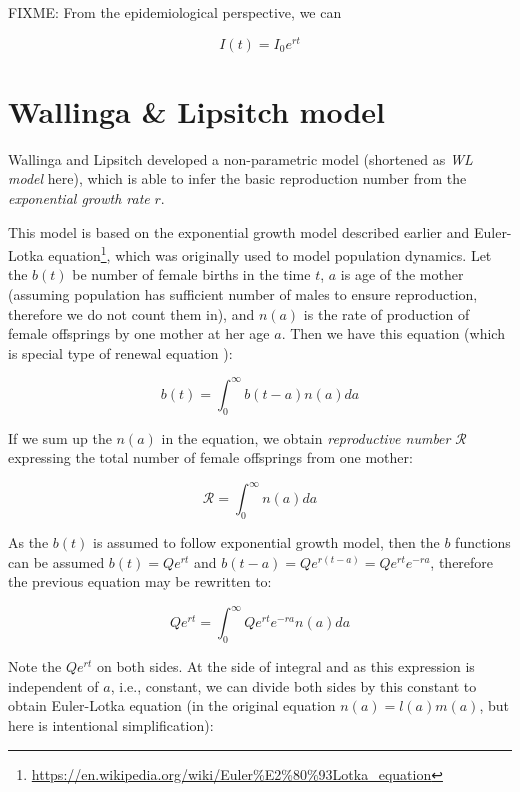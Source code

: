 \documentclass[
  digital, %
  oneside, %
  lof,     %
  lot,     %
]{fithesis4}
\begin{document}
FIXME: From the epidemiological perspective, we can 

\begin{equation}
  I(t) = I_0 e^{rt}
\end{equation}

\section{Wallinga \& Lipsitch model}

Wallinga and Lipsitch \cite{wallinga2007} developed a non-parametric
model (shortened as \textit{WL model} here), which is able to infer
the basic reproduction number from the \textit{exponential growth rate} $r$.

This model is based on the exponential growth model described earlier and
Euler-Lotka equation\footnote{\url{https://en.wikipedia.org/wiki/Euler\%E2\%80\%93Lotka_equation}},
which was originally used to model population dynamics.
Let the $b(t)$ be number of female births in the time $t$, $a$ is 
age of the mother (assuming population has sufficient 
number of males to ensure reproduction, therefore we do not 
count them in), and $n(a)$ is the rate of production of female offsprings 
by one mother at her age $a$. Then we have this equation (which is 
special type of renewal equation \cite{feller1941}):

\begin{equation}
  b(t) = \int_{0}^{\infty} b(t - a) n(a) da
\end{equation}

If we sum up the $n(a)$ in the equation, we obtain \textit{reproductive number} 
$\mathcal{R}$ expressing the total number of female offsprings from one mother:

\begin{equation}\label{eq:wl-model-R}
  \mathcal{R} = \int_0^{\infty} n(a) da
\end{equation}

As the $b(t)$ is assumed to follow exponential growth model, then 
the $b$ functions can be assumed $b(t) = Q e^{rt}$ and 
$b(t - a) = Q e^{r(t - a)} = Q e^{rt} e^{-ra}$, therefore the
previous equation may be rewritten to:

\begin{equation}
  Q e^{rt} = \int_{0}^{\infty} Q e^{rt} e^{-ra} n(a) da
\end{equation}

Note the $Q e^{rt}$ on both sides. At the side of integral and 
as this expression is independent of $a$, i.e., constant, we can 
divide both sides by this constant to obtain Euler-Lotka
equation (in the original equation $n(a) = l(a) m(a)$, but 
here is intentional simplification):
\end{document}
